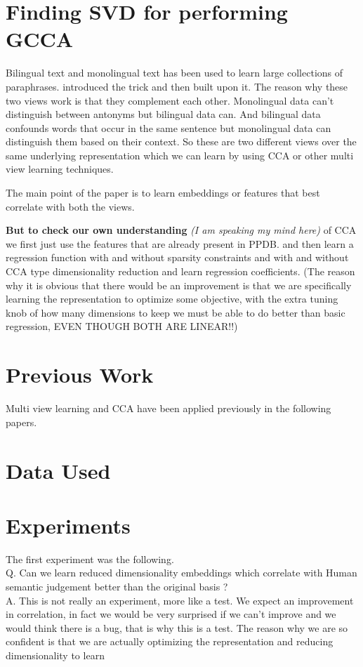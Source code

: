 \documentclass[11pt]{article}
\begin{document}
\section{Finding SVD for performing GCCA}
  
Bilingual text and monolingual text has been used to learn large
collections of paraphrases. \cite{bannard2005paraphrasing} introduced the trick and
then \cite{ganitkevitch2013ppdb} built upon it. The reason why these two views work is
that they complement each other. Monolingual data can't distinguish
between antonyms but bilingual data can. And bilingual data confounds
words that occur in the same sentence but monolingual data can
distinguish them based on their context. So these are two different
views over the same underlying representation which we can learn by
using CCA or other multi view learning techniques.

The main point of the paper is to learn embeddings or features
that best correlate with both the views. 

\textbf{But to check our own understanding} \textit{(I am speaking
  my mind here)} of CCA we first just use the
features that are already present in PPDB. and then learn a regression
function with and without sparsity constraints and with and without
CCA type dimensionality reduction and learn regression
coefficients. (The reason why it is obvious that there would be an
improvement is that we are specifically learning the representation to
optimize some objective, with the extra tuning knob of how many
dimensions to keep we must be able to do better than basic regression,
EVEN THOUGH BOTH ARE LINEAR!!)

\section{Previous Work}
Multi view learning and CCA have been applied previously in the following
papers.

\section{Data Used}


\section{Experiments}
The first experiment was the following. \\
Q. Can we learn reduced dimensionality embeddings which correlate with
Human semantic judgement better than the original basis ? \\
A. This is not really an experiment, more like a test. We expect an
improvement in correlation, in fact we would be very 
surprised if we can't improve and we would think there is a bug, that
is why this is a test. The reason why we are so confident is that we are actually
optimizing the representation and reducing dimensionality to learn 
\end{document}
